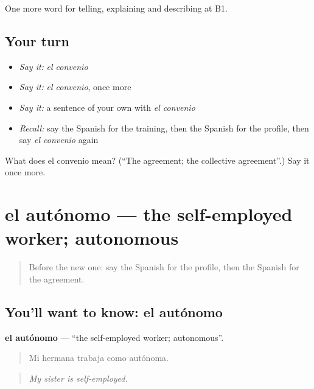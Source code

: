 \begin{grammarlens}[title={What you've built}]
One more word for telling, explaining and describing at B1.
\end{grammarlens}

\subsection*{Your turn}
\begin{itemize}
\raggedright
  \item \emph{Say it:} \emph{el convenio}
  \item \emph{Say it:} \emph{el convenio}, once more
  \item \emph{Say it:} a sentence of your own with \emph{el convenio}
  \item \emph{Recall:} say the Spanish for the training, then the Spanish for the profile, then say \emph{el convenio} again
\end{itemize}

\begin{tcolorbox}[breakable,colback=teal!4,colframe=teal!35!black,title={Before you move on}]
What does el convenio mean? (\textquotedblleft{}The agreement; the collective agreement\textquotedblright{}.) Say it once more.
\end{tcolorbox}
\section[el autónomo]{el autónomo — the self-employed worker; autonomous}

\label{lesson:ES-C591-autonomo}



\begin{quote}
Before the new one: say the Spanish for the profile, then the Spanish for the agreement.
\end{quote}

\subsection*{You'll want to know: el autónomo}
\textbf{el autónomo} — \textquotedblleft{}the self-employed worker; autonomous\textquotedblright{}.

\begin{quote}
Mi hermana trabaja como autónoma.
\end{quote}

\begin{quote}
\emph{My sister is self-employed.}
\end{quote}


